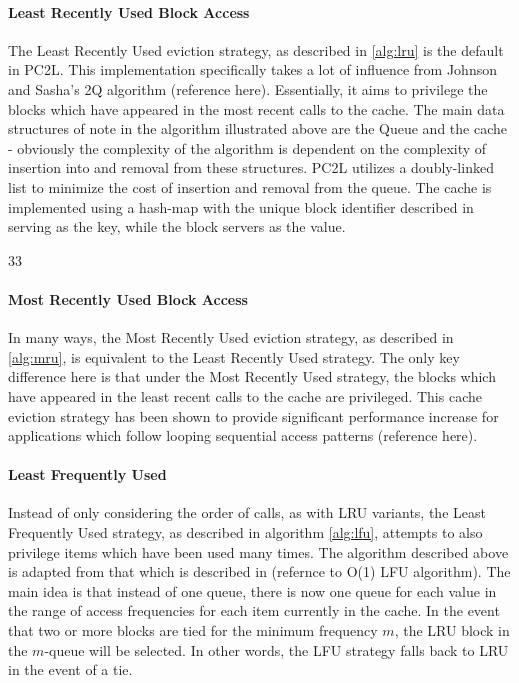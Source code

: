 \paragraph{Least Recently Used Block Access}
The Least Recently Used eviction strategy, as described in \ref{alg:lru} is the default in PC2L. This implementation specifically takes a lot of influence from Johnson and Sasha's 2Q algorithm (reference here). Essentially, it aims to privilege the blocks which have appeared in the most recent calls to the cache. The main data structures of note in the algorithm illustrated above are the Queue and the cache - obviously the complexity of the algorithm is dependent on the complexity of insertion into and removal from these structures. PC2L utilizes a doubly-linked list to minimize the cost of insertion and removal from the queue. The cache is implemented using a hash-map with the unique block identifier described in \label{block_div} serving as the key, while the block servers as the value. 

33\paragraph{Most Recently Used Block Access}
In many ways, the Most Recently Used eviction strategy, as described in \ref{alg:mru}, is equivalent to the Least Recently Used strategy. The only key difference here is that under the Most Recently Used strategy, the blocks which have appeared in the least recent calls to the cache are privileged. This cache eviction strategy has been shown to provide significant performance increase for applications which follow looping sequential access patterns (reference here).

\paragraph{Least Frequently Used}
Instead of only considering the order of calls, as with LRU variants, the Least Frequently Used strategy, as described in algorithm \ref{alg:lfu}, attempts to also privilege items which have been used many times. The algorithm described above is adapted from that which is described in (refernce to O(1) LFU algorithm). The main idea is that instead of one queue, there is now one queue for each value in the range of access frequencies for each item currently in the cache. In the event that two or more blocks are tied for the minimum frequency $m$, the LRU block in the $m$-queue will be selected. In other words, the LFU strategy falls back to LRU in the event of a tie. 


